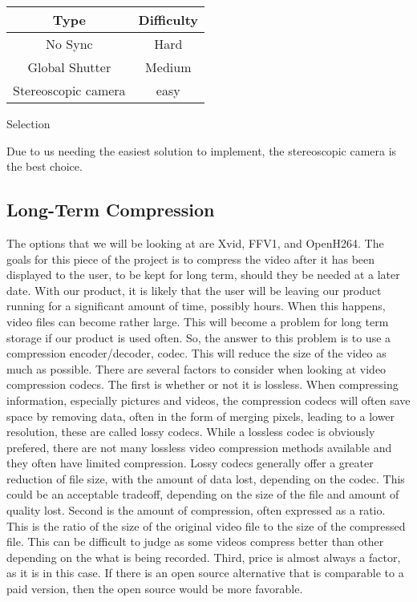 \documentclass[letterpaper,10pt,onecolumn,draftclsnofoot]{IEEEtran}
\begin{document}
\begin{center}
	\begin{tabular}{|c|c|}
		\hline
		\textbf{Type} & \textbf{Difficulty} \\
		\hline
		No Sync & Hard \\
		\hline
		Global Shutter & Medium\\
		\hline
		Stereoscopic camera & easy \\
		\hline
		
	\end{tabular}
\end{center}


Selection

Due to us needing the easiest solution to implement, the stereoscopic camera is the best choice.


\newpage
\subsection{Long-Term Compression} %

The options that we will be looking at are Xvid, FFV1, and OpenH264.
The goals for this piece of the project is to compress the video after it has been displayed to the user, to be kept for long term, should they be needed at a later date.
With our product, it is likely that the user will be leaving our product running for a significant amount of time, possibly hours.
When this happens, video files can become rather large.
This will become a problem for long term storage if our product is used often.
So, the answer to this problem is to use a compression encoder/decoder, codec.
This will reduce the size of the video as much as possible.
There are several factors to consider when looking at video compression codecs.
The first is whether or not it is lossless.
When compressing information, especially pictures and videos, the compression codecs will often save space by removing data, often in the form of merging pixels, leading to a lower resolution, these are called lossy codecs.
While a lossless codec is obviously prefered, there are not many lossless video compression methods available and they often have limited compression.
Lossy codecs generally offer a greater reduction of file size, with the amount of data lost, depending on the codec.
This could be an acceptable tradeoff, depending on the size of the file and amount of quality lost.
Second is the amount of compression, often expressed as a ratio.
This is the ratio of the size of the original video file to the size of the compressed file.
This can be difficult to judge as some videos compress better than other depending on the what is being recorded.
Third, price is almost always a factor, as it is in this case.
If there is an open source alternative that is comparable to a paid version, then the open source would be more favorable.
\end{document}
